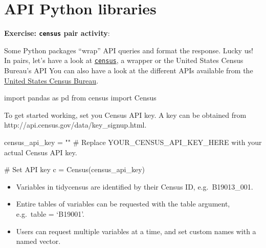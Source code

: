 \documentclass[
  letterpaper,
  DIV=11,
  numbers=noendperiod]{scrreprt}
\newenvironment{Shaded}{\begin{snugshade}}{\end{snugshade}}
\newcommand{\CommentTok}[1]{\textcolor[rgb]{0.37,0.37,0.37}{#1}}
\newcommand{\ImportTok}[1]{\textcolor[rgb]{0.00,0.46,0.62}{#1}}
\newcommand{\NormalTok}[1]{\textcolor[rgb]{0.00,0.23,0.31}{#1}}
\newcommand{\OperatorTok}[1]{\textcolor[rgb]{0.37,0.37,0.37}{#1}}
\newcommand{\StringTok}[1]{\textcolor[rgb]{0.13,0.47,0.30}{#1}}
\providecommand{\tightlist}{%
  \setlength{\itemsep}{0pt}\setlength{\parskip}{0pt}}\usepackage{longtable,booktabs,array}
\begin{document}
\section{API Python libraries}\label{api-python-libraries}

\textbf{Exercise: \texttt{census} pair activity}:

Some Python packages ``wrap'' API queries and format the response. Lucky
us! In pairs, let's have a look at
\href{https://github.com/datamade/census/tree/master}{\texttt{census}},
a wrapper or the United States Census Bureau's API You can also have a
look at the different APIs available from the
\href{https://www.census.gov/data/developers.html}{United States Census
Bureau}.

\begin{Shaded}
\begin{Highlighting}[]
\ImportTok{import}\NormalTok{ pandas }\ImportTok{as}\NormalTok{ pd}
\ImportTok{from}\NormalTok{ census }\ImportTok{import}\NormalTok{ Census}
\end{Highlighting}
\end{Shaded}

To get started working, set you Census API key. A key can be obtained
from http://api.census.gov/data/key\_signup.html.

\begin{Shaded}
\begin{Highlighting}[]
\NormalTok{census\_api\_key }\OperatorTok{=} \StringTok{""} \CommentTok{\# Replace \textquotesingle{}YOUR\_CENSUS\_API\_KEY\_HERE\textquotesingle{} with your actual Census API key.}
\end{Highlighting}
\end{Shaded}

\begin{Shaded}
\begin{Highlighting}[]
\CommentTok{\# Set API key}
\NormalTok{c }\OperatorTok{=}\NormalTok{ Census(census\_api\_key)}
\end{Highlighting}
\end{Shaded}

\begin{itemize}
\tightlist
\item
  Variables in tidycensus are identified by their Census ID,
  e.g.~B19013\_001.
\item
  Entire tables of variables can be requested with the table argument,
  e.g.~table = `B19001'.
\item
  Users can request multiple variables at a time, and set custom names
  with a named vector.
\end{itemize}
\end{document}
